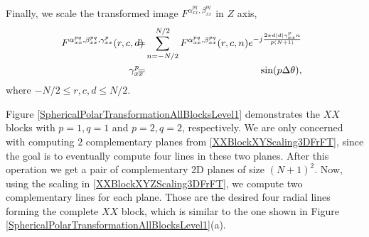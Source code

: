\documentclass{UCF_ETD}
\begin{document}
 Finally, we scale the transformed image $F^{\alpha^{pq}_{xx}, \beta^{pq}_{xx} }$ in $Z$ axis,
 \begin{eqnarray} \label{XXBlockXYZScaling3DFrFT}
 \hskip-0.08in F^{\alpha^{pq}_{xx}, \beta^{pq}_{xx}, \gamma^{p}_{xx} }(r,c,d) & \hskip-0.12in = & \hskip-0.12in \sum\limits_{n=-N/2}^{N/2}F^{\alpha^{pq}_{xx}, \beta^{pq}_{xx} } (r,c,n)  e^{-j\frac{2\pi d |d| \gamma^{p}_{xx} n}{p(N+1)}}  \nonumber \\
 \hskip-0.08in  \gamma^{p}_{xx} & \hskip-0.12in =  & \hskip-0.08in \sin (p\Delta \theta), %
 \end{eqnarray}
 where $-N/2 \leq r,c,d \leq N/2$.
 
 Figure \ref{SphericalPolarTransformationAllBlocksLevel1} demonstrates the $XX$ blocks with $p = 1,q = 1$ and  $p = 2,q = 2$, respectively.
 We are only concerned with computing $2$ complementary planes from \eqref{XXBlockXYScaling3DFrFT},  since the goal is to eventually compute four lines in these two planes.
 After this operation we get a pair of complementary 2D planes of size $(N+1)^2$. Now, using the scaling in \eqref{XXBlockXYZScaling3DFrFT}, we compute two complementary lines for each plane. Those are the desired four radial lines forming the complete $XX$ block, which is similar to the one shown in Figure \ref{SphericalPolarTransformationAllBlocksLevel1}(a).
 
 
\end{document}

